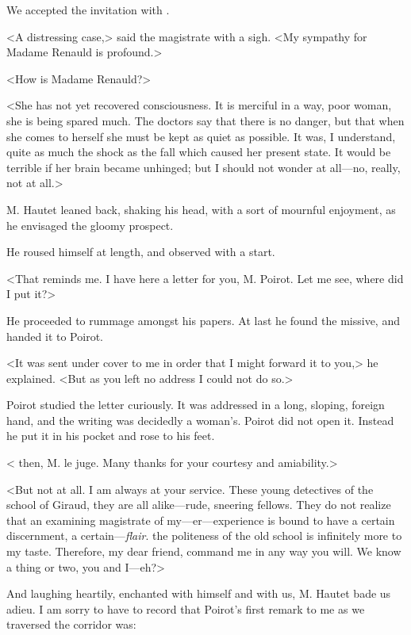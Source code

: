  We accepted the invitation with . 

 <A distressing case,> said the magistrate with a sigh. <My sympathy for Madame Renauld is profound.> 

 <How is Madame Renauld?> 

 <She has not yet recovered consciousness. It is merciful in a way, poor woman, she is being spared much. The doctors say that there is no danger, but that when she comes to herself she must be kept as quiet as possible. It was, I understand, quite as much the shock as the fall which caused her present state. It would be terrible if her brain became unhinged; but I should not wonder at all—no, really, not at all.> 

 M. Hautet leaned back, shaking his head, with a sort of mournful enjoyment, as he envisaged the gloomy prospect. 

 He roused himself at length, and observed with a start. 

 <That reminds me. I have here a letter for you, M. Poirot. Let me see, where did I put it?> 

 He proceeded to rummage amongst his papers. At last he found the missive, and handed it to Poirot. 

 <It was sent under cover to me in order that I might forward it to you,> he explained. <But as you left no address I could not do so.> 

 Poirot studied the letter curiously. It was addressed in a long, sloping, foreign hand, and the writing was decidedly a woman's. Poirot did not open it. Instead he put it in his pocket and rose to his feet. 

 < then, M. le juge. Many thanks for your courtesy and amiability.> 

 <But not at all. I am always at your service. These young detectives of the school of Giraud, they are all alike—rude, sneering fellows. They do not realize that an examining magistrate of my—er—experience is bound to have a certain discernment, a certain—\emph{flair}.  the politeness of the old school is infinitely more to my taste. Therefore, my dear friend, command me in any way you will. We know a thing or two, you and I—eh?> 

 And laughing heartily, enchanted with himself and with us, M. Hautet bade us adieu. I am sorry to have to record that Poirot's first remark to me as we traversed the corridor was: 

